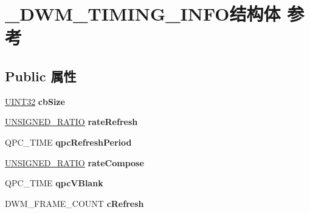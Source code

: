 \hypertarget{struct___d_w_m___t_i_m_i_n_g___i_n_f_o}{}\section{\+\_\+\+D\+W\+M\+\_\+\+T\+I\+M\+I\+N\+G\+\_\+\+I\+N\+F\+O结构体 参考}
\label{struct___d_w_m___t_i_m_i_n_g___i_n_f_o}
\subsection*{Public 属性}
\begin{DoxyCompactItemize}
\item 
\mbox{\label{struct___d_w_m___t_i_m_i_n_g___i_n_f_o_af1410bc1ae95c12fd451bab9816ac4e0}} 
\hyperlink{_processor_bind_8h_ae1e6edbbc26d6fbc71a90190d0266018}{U\+I\+N\+T32} {\bfseries cb\+Size}
\item 
\mbox{\label{struct___d_w_m___t_i_m_i_n_g___i_n_f_o_a36c1a5f6078cc4b608d51c4b73d51239}} 
\hyperlink{struct___u_n_s_i_g_n_e_d___r_a_t_i_o}{U\+N\+S\+I\+G\+N\+E\+D\+\_\+\+R\+A\+T\+IO} {\bfseries rate\+Refresh}
\item 
\mbox{\label{struct___d_w_m___t_i_m_i_n_g___i_n_f_o_ae85f81b50127f8a50561e5bfd3d8c27a}} 
Q\+P\+C\+\_\+\+T\+I\+ME {\bfseries qpc\+Refresh\+Period}
\item 
\mbox{\label{struct___d_w_m___t_i_m_i_n_g___i_n_f_o_a60bbdfc1dc4cac89ebbba94f9728e431}} 
\hyperlink{struct___u_n_s_i_g_n_e_d___r_a_t_i_o}{U\+N\+S\+I\+G\+N\+E\+D\+\_\+\+R\+A\+T\+IO} {\bfseries rate\+Compose}
\item 
\mbox{\label{struct___d_w_m___t_i_m_i_n_g___i_n_f_o_ad5f9b7eaed1125ef2beaf8e0899a13a9}} 
Q\+P\+C\+\_\+\+T\+I\+ME {\bfseries qpc\+V\+Blank}
\item 
\mbox{\label{struct___d_w_m___t_i_m_i_n_g___i_n_f_o_a9fefd736eacdae6026fc0c901578fdcd}} 
D\+W\+M\+\_\+\+F\+R\+A\+M\+E\+\_\+\+C\+O\+U\+NT {\bfseries c\+Refresh}
\item 

\end{DoxyCompactItemize}
